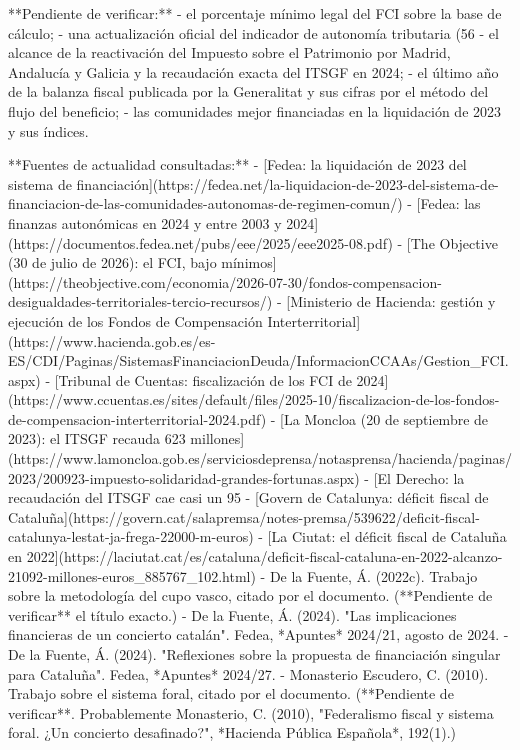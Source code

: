 \documentclass[10pt,a4paper]{article}
\begin{document}
{**Pendiente de verificar:**
- el porcentaje mínimo legal del FCI sobre la base de cálculo;
- una actualización oficial del indicador de autonomía tributaria (56%
- el alcance de la reactivación del Impuesto sobre el Patrimonio por Madrid, Andalucía y Galicia y la recaudación exacta del ITSGF en 2024;
- el último año de la balanza fiscal publicada por la Generalitat y sus cifras por el método del flujo del beneficio;
- las comunidades mejor financiadas en la liquidación de 2023 y sus índices.

**Fuentes de actualidad consultadas:**
- [Fedea: la liquidación de 2023 del sistema de financiación](https://fedea.net/la-liquidacion-de-2023-del-sistema-de-financiacion-de-las-comunidades-autonomas-de-regimen-comun/)
- [Fedea: las finanzas autonómicas en 2024 y entre 2003 y 2024](https://documentos.fedea.net/pubs/eee/2025/eee2025-08.pdf)
- [The Objective (30 de julio de 2026): el FCI, bajo mínimos](https://theobjective.com/economia/2026-07-30/fondos-compensacion-desigualdades-territoriales-tercio-recursos/)
- [Ministerio de Hacienda: gestión y ejecución de los Fondos de Compensación Interterritorial](https://www.hacienda.gob.es/es-ES/CDI/Paginas/SistemasFinanciacionDeuda/InformacionCCAAs/Gestion_FCI.aspx)
- [Tribunal de Cuentas: fiscalización de los FCI de 2024](https://www.ccuentas.es/sites/default/files/2025-10/fiscalizacion-de-los-fondos-de-compensacion-interterritorial-2024.pdf)
- [La Moncloa (20 de septiembre de 2023): el ITSGF recauda 623 millones](https://www.lamoncloa.gob.es/serviciosdeprensa/notasprensa/hacienda/paginas/2023/200923-impuesto-solidaridad-grandes-fortunas.aspx)
- [El Derecho: la recaudación del ITSGF cae casi un 95%
- [Govern de Catalunya: déficit fiscal de Cataluña](https://govern.cat/salapremsa/notes-premsa/539622/deficit-fiscal-catalunya-lestat-ja-frega-22000-m-euros)
- [La Ciutat: el déficit fiscal de Cataluña en 2022](https://laciutat.cat/es/cataluna/deficit-fiscal-cataluna-en-2022-alcanzo-21092-millones-euros_885767_102.html)
- De la Fuente, Á. (2022c). Trabajo sobre la metodología del cupo vasco, citado por el documento. (**Pendiente de verificar** el título exacto.)
- De la Fuente, Á. (2024). "Las implicaciones financieras de un concierto catalán". Fedea, *Apuntes* 2024/21, agosto de 2024.
- De la Fuente, Á. (2024). "Reflexiones sobre la propuesta de financiación singular para Cataluña". Fedea, *Apuntes* 2024/27.
- Monasterio Escudero, C. (2010). Trabajo sobre el sistema foral, citado por el documento. (**Pendiente de verificar**. Probablemente Monasterio, C. (2010), "Federalismo fiscal y sistema foral. ¿Un concierto desafinado?", *Hacienda Pública Española*, 192(1).)
}
\end{document}
